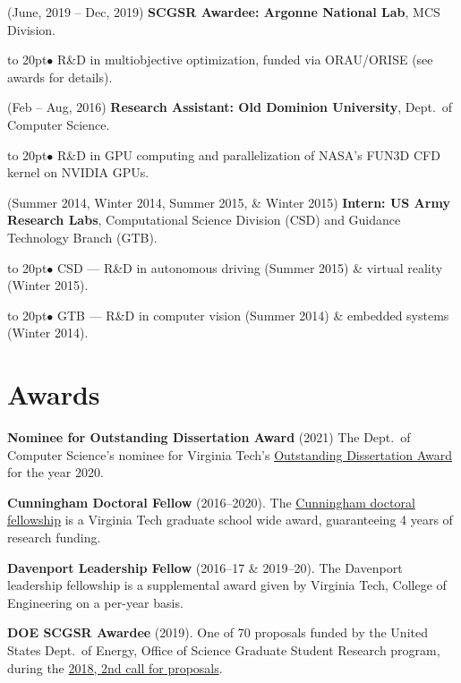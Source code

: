 \documentclass[12pt]{article}
\def\bullitem{\par\hangindent=15pt \hangafter=1
\noindent\hbox to 20pt{\hfil$\bullet$\hfil}\ignorespaces}
\begin{document}
\medskip

\hangindent=0.3in
(June, 2019 -- Dec, 2019)
\textbf{SCGSR Awardee: Argonne National Lab}, MCS Division.
\bullitem
R\&D in multiobjective optimization, funded via ORAU/ORISE
(see awards for details).

\medskip

\hangindent=0.3in
(Feb -- Aug, 2016)
\textbf{Research Assistant: Old Dominion University},
Dept.\ of Computer Science.
\bullitem
R\&D in GPU computing and parallelization of NASA's FUN3D CFD kernel on
NVIDIA GPUs.

\medskip

\hangindent=0.3in
(Summer 2014, Winter 2014, Summer 2015, \& Winter 2015)
\textbf{Intern: US Army Research Labs}, 
Computational Science Division (CSD) and Guidance Technology Branch (GTB).
\bullitem
CSD --- R\&D in autonomous driving (Summer 2015) \&
virtual reality (Winter 2015).
\bullitem
GTB --- R\&D in computer vision (Summer 2014) \& embedded systems (Winter 2014).

\medskip

\newpage

\section*{Awards}

\textbf{Nominee for Outstanding Dissertation Award} (2021)
The Dept.\ of Computer Science's nominee for Virginia Tech's
\href{https://graduateschool.vt.edu/about/awards/student/oustanding-dissertation-award.html}{Outstanding Dissertation Award}
for the year 2020.

\textbf{Cunningham Doctoral Fellow} (2016--2020).
The 
\href{https://graduateschool.vt.edu/funding/types-of-funding/funding-sponsored-by-the-graduate-school/cunningham-doctoral-assistantships.html}
{Cunningham doctoral fellowship} is a Virginia Tech graduate school wide
award, guaranteeing 4 years of research funding.

\textbf{Davenport Leadership Fellow} (2016--17 \& 2019--20).
The Davenport leadership fellowship is a supplemental award given by
Virginia Tech, College of Engineering on a per-year basis.

\textbf{DOE SCGSR Awardee} (2019).
One of 70 proposals funded by the United States Dept.\ of Energy,
Office of Science Graduate Student Research program, during the
\href{https://www.energy.gov/articles/doe-s-science-graduate-student-research-program-selects-70-students-pursue-research-doe}{2018, 2nd call for proposals}.
\end{document}
